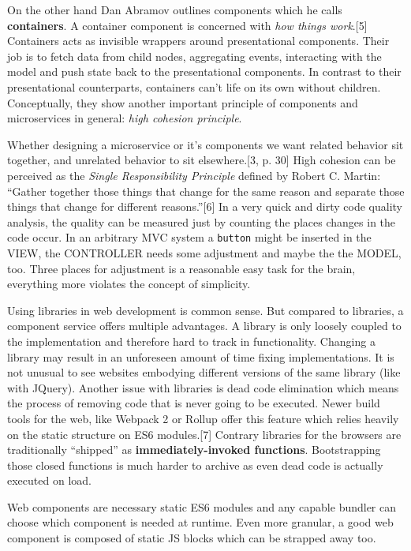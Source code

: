 \documentclass[]{assets/latex/ieee}
\begin{document}
On the other hand Dan Abramov outlines components which he calls
\textbf{containers}. A container component is concerned with \emph{how
things work}.{[}5{]} Containers acts as invisible wrappers around
presentational components. Their job is to fetch data from child nodes,
aggregating events, interacting with the model and push state back to
the presentational components. In contrast to their presentational
counterparts, containers can't life on its own without children.
Conceptually, they show another important principle of components and
microservices in general: \emph{high cohesion principle}.

Whether designing a microservice or it's components we want related
behavior sit together, and unrelated behavior to sit elsewhere.{[}3, p.
30{]} High cohesion can be perceived as the \emph{Single Responsibility
Principle} defined by Robert C. Martin: ``Gather together those things
that change for the same reason and separate those things that change
for different reasons.''{[}6{]} In a very quick and dirty code quality
analysis, the quality can be measured just by counting the places
changes in the code occur. In an arbitrary MVC system a \texttt{button}
might be inserted in the VIEW, the CONTROLLER needs some adjustment and
maybe the the MODEL, too. Three places for adjustment is a reasonable
easy task for the brain, everything more violates the concept of
simplicity.

Using libraries in web development is common sense. But compared to
libraries, a component service offers multiple advantages. A library is
only loosely coupled to the implementation and therefore hard to track
in functionality. Changing a library may result in an unforeseen amount
of time fixing implementations. It is not unusual to see websites
embodying different versions of the same library (like with JQuery).
Another issue with libraries is dead code elimination which means the
process of removing code that is never going to be executed. Newer build
tools for the web, like Webpack 2 or Rollup offer this feature which
relies heavily on the static structure on ES6 modules.{[}7{]} Contrary
libraries for the browsers are traditionally ``shipped'' as
\textbf{immediately-invoked functions}. Bootstrapping those closed
functions is much harder to archive as even dead code is actually
executed on load.

Web components are necessary static ES6 modules and any capable bundler
can choose which component is needed at runtime. Even more granular, a
good web component is composed of static JS blocks which can be strapped
away too.
\end{document}
